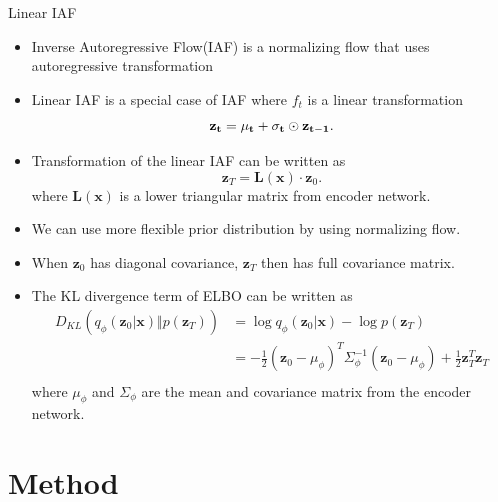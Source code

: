 \documentclass{beamer}
\begin{document}
\begin{frame}[allowframebreaks]{Linear IAF}
    \begin{itemize}
        \item Inverse Autoregressive Flow(IAF) is a normalizing flow that uses autoregressive transformation \cite{kingma2016iaf}
        \item Linear IAF is a special case of IAF where $f_t$ is a linear transformation
        \begin{equation*}
            \bf z_t = \bf \mu_t + \bf \sigma_t \odot \bf z_{t-1}.
        \end{equation*}
        \item Transformation of the linear IAF can be written as
        \begin{equation*}
            \mathbf{z}_T = \mathbf{L(x)} \cdot \mathbf{z}_0.
        \end{equation*}
        where $\mathbf{L(x)}$ is a lower triangular matrix from encoder network.
        \item We can use more flexible prior distribution by using normalizing flow.
        \item When $\mathbf z_0$ has diagonal covariance, $\mathbf z_T$ then has full covariance matrix.
        \item The KL divergence term of ELBO can be written as
        \begin{equation*}
            \begin{aligned}
                D_{KL}(q_\phi(\mathbf{z}_0 | \mathbf{x}) \Vert p(\mathbf{z}_T)) &=
                \log q_\phi(\mathbf{z}_0 | \mathbf{x}) - \log p(\mathbf{z}_T) \\
                &= -\frac{1}{2}(\mathbf{z}_0 -\mu_\phi)^T\Sigma_\phi^{-1}(\mathbf{z}_0 -\mu_\phi) + \frac{1}{2}\mathbf{z}_T^T\mathbf{z}_T \\
            \end{aligned}
        \end{equation*}
        where $\mu_\phi$ and $\Sigma_\phi$ are the mean and covariance matrix from the encoder network.
    \end{itemize}
\end{frame}

\section{Method}
\end{document}
